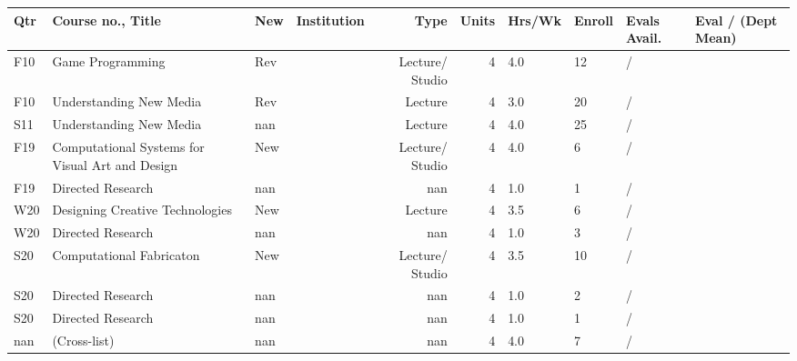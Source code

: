 
\begin{longtable}{lp{6.5cm}p{1cm}rrrp{2cm}}
Qtr & Course no., Title & New & Institution & Type & Units & Hrs/Wk & Enroll & Evals Avail. & Eval / (Dept Mean)\\
\hline 
\endhead 
F10 & Game Programming & Rev &  & Lecture/ Studio & 4 & 4.0 & 12 & / \\ 
F10 & Understanding New Media & Rev &  & Lecture & 4 & 3.0 & 20 & / \\ 
S11 & Understanding New Media & nan &  & Lecture & 4 & 4.0 & 25 & / \\ 
F19 & Computational Systems for Visual Art and Design & New &  & Lecture/ Studio & 4 & 4.0 & 6 & / \\ 
F19 & Directed Research & nan &  & nan & 4 & 1.0 & 1 & / \\ 
W20 & Designing Creative Technologies & New &  & Lecture & 4 & 3.5 & 6 & / \\ 
W20 & Directed Research & nan &  & nan & 4 & 1.0 & 3 & / \\ 
S20 & Computational Fabricaton & New &  & Lecture/ Studio & 4 & 3.5 & 10 & / \\ 
S20 & Directed Research & nan &  & nan & 4 & 1.0 & 2 & / \\ 
S20 & Directed Research & nan &  & nan & 4 & 1.0 & 1 & / \\ 
nan & (Cross-list) & nan &  & nan & 4 & 4.0 & 7 & / \\ 
 
\end{longtable}

